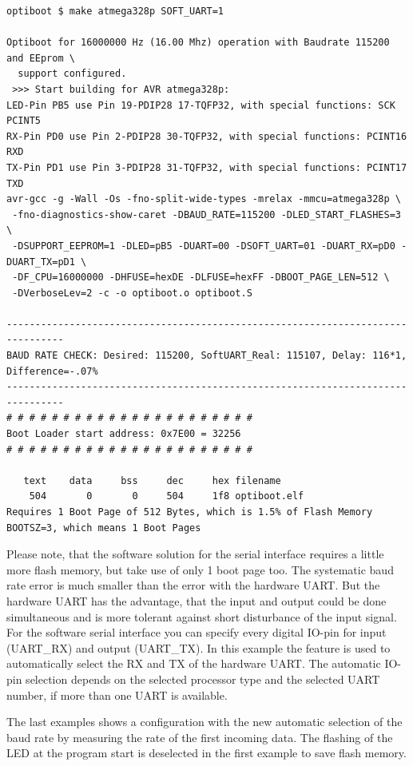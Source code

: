 \begin{verbatim}
optiboot $ make atmega328p SOFT_UART=1

Optiboot for 16000000 Hz (16.00 Mhz) operation with Baudrate 115200 and EEprom \
  support configured.
 >>> Start building for AVR atmega328p:
LED-Pin PB5 use Pin 19-PDIP28 17-TQFP32, with special functions: SCK PCINT5
RX-Pin PD0 use Pin 2-PDIP28 30-TQFP32, with special functions: PCINT16 RXD
TX-Pin PD1 use Pin 3-PDIP28 31-TQFP32, with special functions: PCINT17 TXD
avr-gcc -g -Wall -Os -fno-split-wide-types -mrelax -mmcu=atmega328p \
 -fno-diagnostics-show-caret -DBAUD_RATE=115200 -DLED_START_FLASHES=3 \
 -DSUPPORT_EEPROM=1 -DLED=pB5 -DUART=00 -DSOFT_UART=01 -DUART_RX=pD0 -DUART_TX=pD1 \
 -DF_CPU=16000000 -DHFUSE=hexDE -DLFUSE=hexFF -DBOOT_PAGE_LEN=512 \
 -DVerboseLev=2 -c -o optiboot.o optiboot.S

--------------------------------------------------------------------------------
BAUD RATE CHECK: Desired: 115200, SoftUART_Real: 115107, Delay: 116*1, Difference=-.07%
--------------------------------------------------------------------------------
# # # # # # # # # # # # # # # # # # # # # #
Boot Loader start address: 0x7E00 = 32256
# # # # # # # # # # # # # # # # # # # # # #

   text    data     bss     dec     hex filename
    504       0       0     504     1f8 optiboot.elf
Requires 1 Boot Page of 512 Bytes, which is 1.5% of Flash Memory
BOOTSZ=3, which means 1 Boot Pages

\end{verbatim}

Please note, that the software solution for the serial interface requires a little more flash memory,
but take use of only 1 boot page too. The systematic baud rate error is much smaller than the error with the hardware UART.
But the hardware UART has the advantage, that the input and output could be done simultaneous and is more tolerant against
short disturbance of the input signal.
For the software serial interface you can specify every digital IO-pin for input (UART\_RX) and output (UART\_TX). 
In this example the feature is used to automatically select the RX and TX of the hardware UART.
The automatic IO-pin selection depends on the selected processor type and the selected UART number, if more than
one UART is available.


The last examples shows a configuration with the new automatic selection of the baud rate
by measuring the rate of the first incoming data.
The flashing of the LED at the program start is deselected in the first example to save flash memory.

